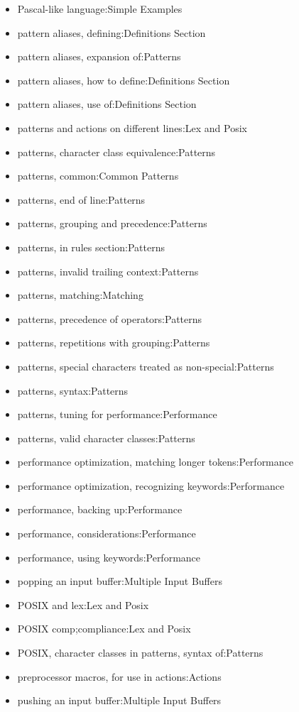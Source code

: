 \documentclass[openany,oneside]{book}
\begin{document}
\begin{itemize}
\item Pascal-like language:Simple Examples
\item pattern aliases, defining:Definitions Section
\item pattern aliases, expansion of:Patterns
\item pattern aliases, how to define:Definitions Section
\item pattern aliases, use of:Definitions Section
\item patterns and actions on different lines:Lex and Posix
\item patterns, character class equivalence:Patterns
\item patterns, common:Common Patterns
\item patterns, end of line:Patterns
\item patterns, grouping and precedence:Patterns
\item patterns, in rules section:Patterns
\item patterns, invalid trailing context:Patterns
\item patterns, matching:Matching
\item patterns, precedence of operators:Patterns
\item patterns, repetitions with grouping:Patterns
\item patterns, special characters treated as non-special:Patterns
\item patterns, syntax:Patterns
\item patterns, tuning for performance:Performance
\item patterns, valid character classes:Patterns
\item performance optimization, matching longer tokens:Performance
\item performance optimization, recognizing keywords:Performance
\item performance, backing up:Performance
\item performance, considerations:Performance
\item performance, using keywords:Performance
\item popping an input buffer:Multiple Input Buffers
\item POSIX and lex:Lex and Posix
\item POSIX comp;compliance:Lex and Posix
\item POSIX, character classes in patterns, syntax of:Patterns
\item preprocessor macros, for use in actions:Actions
\item pushing an input buffer:Multiple Input Buffers

\end{itemize}
\end{document}

